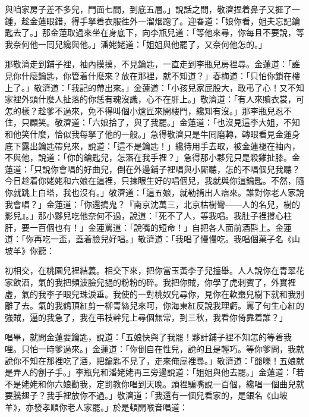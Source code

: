 與咱家房子差不多兒，門面七間，到底五層。」說話之間，敬濟捏着鼻子又捱了一鍾，趁金蓮眼錯，得手拏着衣服徃外一溜烟跑了。迎春道：「娘你看，姐夫忘記鑰匙去了。」那金蓮取過來坐在身底下，向李瓶兒道：「等他來尋，你每且不要說，等我奈何他一囘兒纔與他。」潘姥姥道：「姐姐與他罷了，又奈何他怎的。」

那敬濟走到鋪子裡，袖內摸摸，不見鑰匙，一直走到李瓶兒房裡尋。金蓮道：「誰見你什麼鑰匙，你管着什麼來？放在那裡，就不知道？」春梅道：「只怕你鎖在樓上了。」敬濟道：「我記的帶出來。」金蓮道：「小孩兒家屁股大，敢弔了心！又不知家裡外頭什麼人扯落的你恁有魂沒識，心不在肝上。」{}敬濟道：「有人來贖衣裳，可怎的樣？趁爹不過來，免不得叫個小爐匠來開樓門，纔知有沒。」那李瓶兒忍不住，只顧笑。敬濟道：「六娘拾了，與了我罷。」金蓮道：「也沒見這李大姐，不知和他笑什麼，恰似我每拏了他的一般。」急得敬濟只是牛囘磨轉，轉眼看見金蓮身底下露出鑰匙帶兒來，說道：「這不是鑰匙！」纔待用手去取，被金蓮褪在袖內，不與他，說道：「你的鑰匙兒，怎落在我手裡？」急得那小夥兒只是殺雞扯膝。金蓮道：「只說你會唱的好曲兒，倒在外邊鋪子裡唱與小厮聽，怎的不唱個兒我聽？今日趁着你姥姥和六娘在這裡，只揀眼生好的唱個兒，我就與你這鑰匙。不然，隨你就跳上白塔，我也沒有。」敬濟道：「這五娘，就勒掯出人痞來。誰對你老人家說我會唱？」金蓮道：「你還搗鬼？『南京沈萬三，北京枯樹彎——人的名兒，樹的影兒』。」那小夥兒吃他奈何不過，說道：「死不了人，等我唱。我肚子裡撐心柱肝，要一百個也有！」金蓮罵道：「說嘴的短命！」自把各人面前酒斟上。金蓮道：「你再吃一盃，蓋着臉兒好唱。」敬濟道：「我唱了慢慢吃。我唱個菓子名《山坡羊》你聽：

\begin{myquote} 
初相交，在桃園兒裡結義。相交下來，把你當玉黃李子兒擡舉。人人說你在青翠花家飲酒，氣的我把頻波臉兒撾的粉粉的碎。我把你賊，你學了虎刺賓了，外實裡虛，氣的我李子眼兒珠淚垂。我使的一對桃奴兒尋你，見你在軟棗兒樹下就和我別離了去。氣的我鶴頂紅剪一柳青絲兒來呵，你海東紅反說我理虧。罵了句生心紅的強賊，逼的我急了，我在弔枝幹兒上尋個無常，到三秋，我看你倚靠着誰？」
\end{myquote} 

唱畢，就問金蓮要鑰匙，說道：「五娘快與了我罷！夥計鋪子裡不知怎的等着我哩。只怕一時爹過來。」金蓮道：「你倒自在性兒，說的且是輕巧。等你爹問，我就說你不知在那裡吃了酒，把鑰匙不見了，走來俺屋裡尋。」敬濟道：「爺嚛！五娘就是弄人的劊子手。」{}李瓶兒和潘姥姥再三旁邊說道：「姐姐與他去罷。」金蓮道：「若不是姥姥和你六娘勸我，定罰教你唱到天晚。頭裡騙嘴說一百個，纔唱一個曲兒就要騰翅子？我手裡放你不過。」敬濟道：「我還有一個兒看家的，是銀名《山坡羊》，亦發孝順你老人家罷。」於是頓開喉音唱道：

